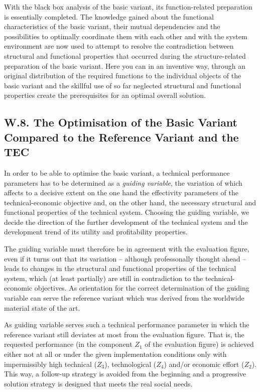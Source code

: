 \documentclass[11pt,a4paper]{article}
\begin{document}
With the black box analysis of the basic variant, its function-related
preparation is essentially completed. The knowledge gained about the
functional characteristics of the basic variant, their mutual dependencies and
the possibilities to optimally coordinate them with each other and with the
system environment are now used to attempt to resolve the contradiction
between structural and functional properties that occurred during the
structure-related preparation of the basic variant.  Here you can in an
inventive way, through an original distribution of the required functions to
the individual objects of the basic variant and the skillful use of so far
neglected structural and functional properties create the prerequisites for an
optimal overall solution.

\subsection*{W.8. The Optimisation of the Basic Variant Compared to the
  Reference Variant and the TEC}

In order to be able to optimise the basic variant, a technical performance
parameters has to be determined as a \emph{guiding variable}, the variation of
which affects to a decisive extent on the one hand the effectivity parameters
of the technical-economic objective and, on the other hand, the necessary
structural and functional properties of the technical system. Choosing the
guiding variable, we decide the direction of the further development of the
technical system and the development trend of its utility and profitability
properties.

The guiding variable must therefore be in agreement with the evaluation figure,
even if it turns out that its variation -- although professonally thought
ahead -- leads to changes in the structural and functional properties of the
technical system, which (at least partially) are still in contradiction to the
technical-economic objectives. As orientation for the correct determination of
the guiding variable can serve the reference variant which was derived from
the worldwide material state of the art.

As guiding variable serves such a technical performance parameter in which the
reference variant still deviates at most from the evaluation figure.  That is,
the requested performance (in the component $Z_1$ of the evaluation figure) is
achieved either not at all or under the given implementation conditions only
with impermissibly high technical ($Z_3$), technological ($Z_4$) and/or
economic effort ($Z_2$).  This way, a follow-up strategy is avoided from the
beginning and a progressive solution strategy is designed that meets the real
social needs.
\end{document}
